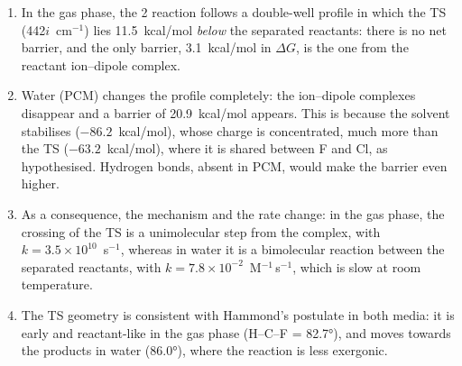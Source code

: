 \documentclass[10pt,a4paper]{article}
\begin{document}
\begin{enumerate}
  \item In the gas phase, the 2 reaction  follows a
    double-well profile in which the TS (442$i$~cm$^{-1}$) lies 11.5~kcal/mol
    \emph{below} the separated reactants: there is no net barrier, and the only
    barrier, 3.1~kcal/mol in $\Delta G$, is the one from the reactant ion--dipole
    complex.
  \item Water (PCM) changes the profile completely: the ion--dipole complexes
    disappear and a barrier of 20.9~kcal/mol appears. This is because the solvent
    stabilises  ($-86.2$~kcal/mol), whose charge is concentrated, much more than
    the TS ($-63.2$~kcal/mol), where it is shared between F and Cl, as hypothesised.
    Hydrogen bonds, absent in PCM, would make the barrier even higher.
  \item As a consequence, the mechanism and the rate change: in the gas phase, the
    crossing of the TS is a unimolecular step from the complex,
    with $k = 3.5\times10^{10}$~s$^{-1}$, whereas in water it is a bimolecular
    reaction between the separated reactants, with
    $k = 7.8\times10^{-2}$~M$^{-1}$\,s$^{-1}$, which is slow at room temperature.
  \item The TS geometry is consistent with Hammond's postulate in both media: it is
    early and reactant-like in the gas phase (H--C--F = \ang{82.7}), and moves towards
    the products in water (\ang{86.0}), where the reaction is less exergonic.
\end{enumerate}


\end{document}
